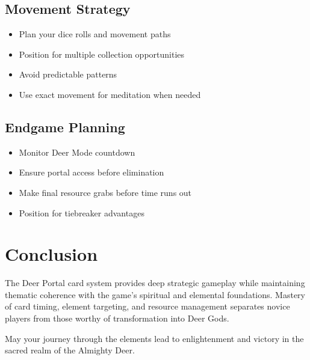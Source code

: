 \documentclass[12pt,a4paper]{article}
\begin{document}
\subsection{Movement Strategy}
\begin{itemize}
    \item Plan your dice rolls and movement paths
    \item Position for multiple collection opportunities
    \item Avoid predictable patterns
    \item Use exact movement for meditation when needed
\end{itemize}

\subsection{Endgame Planning}
\begin{itemize}
    \item Monitor Deer Mode countdown
    \item Ensure portal access before elimination
    \item Make final resource grabs before time runs out
    \item Position for tiebreaker advantages
\end{itemize}

\section{Conclusion}

The Deer Portal card system provides deep strategic gameplay while maintaining thematic coherence with the game's spiritual and elemental foundations. Mastery of card timing, element targeting, and resource management separates novice players from those worthy of transformation into Deer Gods.

May your journey through the elements lead to enlightenment and victory in the sacred realm of the Almighty Deer.
\end{document}
